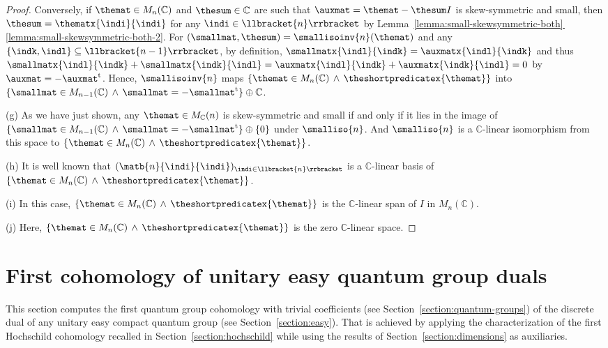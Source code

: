 \documentclass[10pt,a4paper]{amsart}
\numberwithin{equation}{section}
\newcommand{\identitymatrix}{I}
\newcommand{\Sand}{\,\wedge\,}
\newcommand{\comps}{\mathbb{C}}
\newcommand{\dwi}[1]{\llbracket{#1}\rrbracket}
\newcommand{\Sdirectsum}{\oplus}
\newcommand{\Stra}{^{\mathrm{t}}}
\newcommand{\squarematrices}[2]{M_{#1}(#2)}
\newcommand{\thedim}{n}
\begin{document}
{\begin{proof}
   Conversely, if $\themat\in\squarematrices{\thedim}{\comps}$ and $\thesum\in\comps$ are such that  $\auxmat=\themat-\thesum\identitymatrix$ is skew-symmetric and small, then   $\thesum=\thematx{\indi}{\indi}$ for any $\indi\in\dwi{\thedim}$ by Lem\-ma~\hyperref[lemma:small-skewsymmetric-both-2]{\ref*{lemma:small-skewsymmetric-both}\,\ref*{lemma:small-skewsymmetric-both-2}}. For $(\smallmat,\thesum)=\smallisoinv{\thedim}(\themat)$  and any $\{\indk,\indl\}\subseteq \dwi{\thedim-1}$, by definition, $\smallmatx{\indl}{\indk}=\auxmatx{\indl}{\indk}$ and thus  $\smallmatx{\indl}{\indk}+\smallmatx{\indk}{\indl}=\auxmatx{\indl}{\indk}+\auxmatx{\indk}{\indl}=0$ by $\auxmat=-\auxmat\Stra$. Hence,  $\smallisoinv{\thedim}$ maps $\{\themat\in\squarematrices{\thedim}{\comps}\Sand \theshortpredicatex{\themat}\}$ into $\{\smallmat\in\squarematrices{\thedim-1}{\comps}\Sand \smallmat=-\smallmat\Stra\}\Sdirectsum\comps$.

   (g)
   As we have just shown, any $\themat\in\squarematrices{\comps}{\thedim}$ is skew-symmetric and small if and only if it lies in the image of $\{\smallmat\in\squarematrices{\thedim-1}{\comps}\Sand \smallmat=-\smallmat\Stra\}\Sdirectsum\{0\}$ under $\smalliso{\thedim}$. And  $\smalliso{\thedim}$ is a $\comps$-linear isomorphism from this space to  $\{\themat\in\squarematrices{\thedim}{\comps}\Sand \theshortpredicatex{\themat}\}$.

   (h)
   It is well known that $(\matb{\thedim}{\indi}{\indi})_{\indi\in\dwi{\thedim}}$ is a $\comps$-linear basis of $\{\themat\in\squarematrices{\thedim}{\comps}\Sand \theshortpredicatex{\themat}\}$.

   (i)
   In this case, $\{\themat\in\squarematrices{\thedim}{\comps}\Sand \theshortpredicatex{\themat}\}$ is the $\comps$-linear span of $\identitymatrix$ in $\squarematrices{\thedim}{\comps}$.

   (j)
   Here,  $\{\themat\in\squarematrices{\thedim}{\comps}\Sand \theshortpredicatex{\themat}\}$ is the zero  $\comps$-linear space.
  \end{proof}
  }


\section{First cohomology of unitary easy quantum group duals}
\label{section:main-one}
This section computes the first quantum group  cohomology with trivial coefficients (see Section~\ref{section:quantum-groups}) of the discrete dual of any unitary easy compact quantum group (see Section~\ref{section:easy}). That is achieved by applying the characterization of the first Hochschild cohomology recalled in Section~\ref{section:hochschild} while using the results of Section~\ref{section:dimensions} as auxiliaries.
\end{document}

